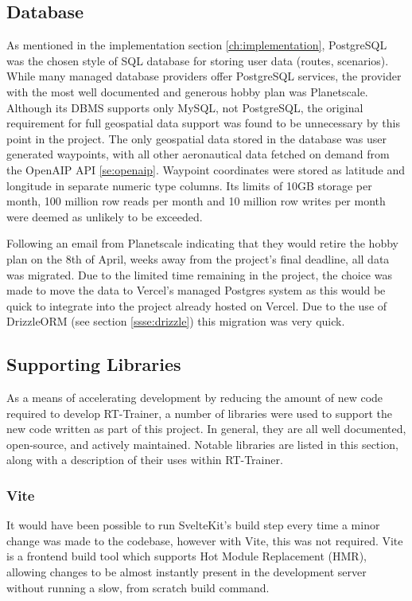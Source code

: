 \subsection{Database}
\label{sse:database}
As mentioned in the implementation section \ref{ch:implementation}, PostgreSQL was the chosen style of SQL database for storing user data (routes, scenarios). While many managed database providers offer PostgreSQL services, the provider with the most well documented and generous hobby plan was Planetscale. Although its DBMS supports only MySQL, not PostgreSQL, the original requirement for full geospatial data support was found to be unnecessary by this point in the project. The only geospatial data stored in the database was user generated waypoints, with all other aeronautical data fetched on demand from the OpenAIP API \ref{se:openaip}. Waypoint coordinates were stored as latitude and longitude in separate numeric type columns. Its limits of 10GB storage per month, 100 million row reads per month and 10 million row writes per month were deemed as unlikely to be exceeded.

Following an email from Planetscale indicating that they would retire the hobby plan on the 8th of April, weeks away from the project's final deadline, all data was migrated. Due to the limited time remaining in the project, the choice was made to move the data to Vercel's managed Postgres system as this would be quick to integrate into the project already hosted on Vercel. Due to the use of DrizzleORM (see  section \ref{ssse:drizzle}) this migration was very quick.

\subsection{Supporting Libraries}
\label{sse:libraries}
As a means of accelerating development by reducing the amount of new code required to develop RT-Trainer, a number of libraries were used to support the new code written as part of this project. In general, they are all well documented, open-source, and actively maintained. Notable libraries are listed in this section, along with a description of their uses within RT-Trainer.

\subsubsection{Vite}
\label{ssse:vite}
It would have been possible to run SvelteKit's build step every time a minor change was made to the codebase, however with Vite, this was not required. Vite is a frontend build tool which supports Hot Module Replacement (HMR), allowing changes to be almost instantly present in the development server without running a slow, from scratch build command.

